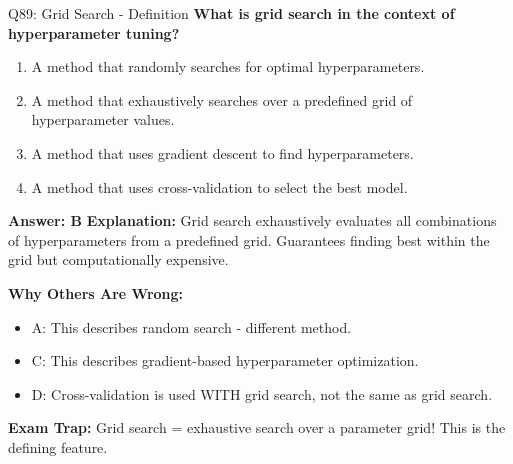 \documentclass[8pt]{beamer}
\begin{document}
	\begin{frame}{Q89: Grid Search - Definition}
		\fontsize{6.5}{7.5}\selectfont
		\textbf{What is grid search in the context of hyperparameter tuning?}
		
		\begin{enumerate}
			\item A method that randomly searches for optimal hyperparameters.
			\item A method that exhaustively searches over a predefined grid of hyperparameter values.
			\item A method that uses gradient descent to find hyperparameters.
			\item A method that uses cross-validation to select the best model.
		\end{enumerate}
		
		\vspace{0.05cm}
		\textcolor{myblue}{\textbf{Answer: B}}
		\vspace{0.05cm}
		\textcolor{myblue}{\textbf{Explanation:}} Grid search exhaustively evaluates all combinations of hyperparameters from a predefined grid. Guarantees finding best within the grid but computationally expensive.
		
		\vspace{0.05cm}
		\textcolor{myred}{\textbf{Why Others Are Wrong:}}
		\begin{itemize}
			\item \textcolor{myred}{A:} This describes random search - different method.
			\item \textcolor{myred}{C:} This describes gradient-based hyperparameter optimization.
			\item \textcolor{myred}{D:} Cross-validation is used WITH grid search, not the same as grid search.
		\end{itemize}
		
		\textcolor{myred}{\textbf{Exam Trap:}} Grid search = \textcolor{myblue}{exhaustive search} over a parameter grid! This is the defining feature.
	\end{frame}
	
\end{document}
